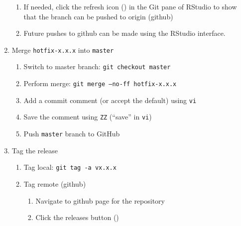 \documentclass{article}
\begin{document}
\begin{enumerate}
\begin{enumerate}
	\item If needed, click the refresh icon 
  		  () in the Git pane of RStudio to 
  		  show that the branch can be pushed to origin (github)

  	\item Future pushes to github can be made using the RStudio interface.

  \end{enumerate}
  \item Merge \texttt{hotfix-x.x.x} into \texttt{master}  
  \begin{enumerate}

    \item Switch to master branch: \texttt{git checkout master} 
	
    \item Perform merge: \texttt{git merge --no-ff hotfix-x.x.x} 
	
	\item Add a commit comment (or accept the default) using \texttt{vi} 
	
	\item Save the comment using \texttt{ZZ} (``save'' in \texttt{vi})
	
	\item Push \texttt{master} branch to GitHub 

  \end{enumerate}
  \item Tag the release
  \begin{enumerate}

    \item Tag local: \texttt{git tag -a vx.x.x}

    \item Tag remote (github)
	\begin{enumerate}

	  \item Navigate to github page for the repository

	  \item Click the releases button ()
	  

\end{enumerate}
\end{enumerate}
\end{enumerate}
\end{document}
